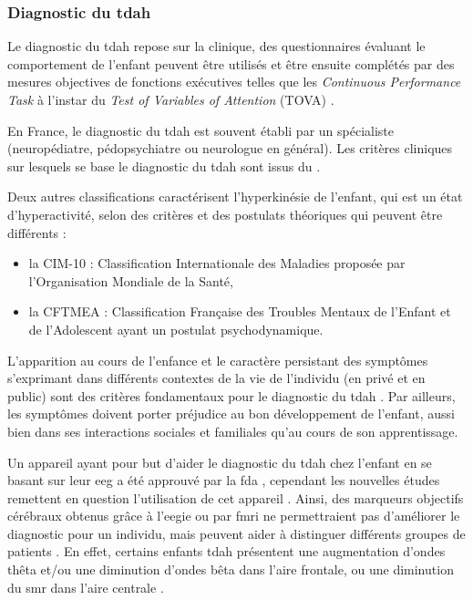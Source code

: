 \subsubsection{Diagnostic du \gls{tdah}}

Le diagnostic du \gls{tdah} repose sur la clinique, des questionnaires évaluant le comportement de l'enfant peuvent être utilisés et être ensuite 
complétés par des mesures objectives de fonctions exécutives telles que les \textit{Continuous Performance Task} \citep{Barkley1991} à l'instar du 
\textit{Test of Variables of Attention} (TOVA) \citep{Forbes1998}.

En France, le diagnostic du \gls{tdah} est souvent établi par un spécialiste (neuropédiatre, pédopsychiatre ou neurologue en général).
Les critères cliniques sur lesquels se base le diagnostic du \gls{tdah} sont issus du \citet{DSM-5}.

Deux autres classifications caractérisent l'hyperkinésie de l'enfant, qui est un état d'hyperactivité, selon des critères et des postulats théoriques 
qui peuvent être différents : 
\begin{itemize}
\item la CIM-10 : Classification Internationale des Maladies proposée par l'Organisation Mondiale de la Santé,
\item la CFTMEA : Classification Française des Troubles Mentaux de l'Enfant et de l'Adolescent ayant un postulat psychodynamique.
\end{itemize}

L'apparition au cours de l'enfance et le caractère persistant des symptômes s'exprimant dans différents contextes de la vie de l'individu (en privé et 
en public) sont des critères fondamentaux pour le diagnostic du \gls{tdah} \citep{HAS}. Par ailleurs, les symptômes doivent porter préjudice au bon 
développement de l'enfant, aussi bien dans ses interactions sociales et familiales qu'au cours de son apprentissage. 

Un appareil ayant pour but d'aider le diagnostic du \gls{tdah} chez l'enfant en se basant sur leur \gls{eeg} 
a été approuvé par la \gls{fda} \citep{FDA, NebaHealth}, cependant les nouvelles études remettent en question l'utilisation de cet appareil \citep{Arns2013, 
Zhang2017}. Ainsi, des marqueurs objectifs cérébraux obtenus grâce à l'\gls{eegie} ou par \gls{fmri} ne permettraient pas d'améliorer le diagnostic pour un individu, mais
peuvent aider à distinguer différents groupes de patients \citep{Johnstone2005, Zhang2017, Clarke2011}. En effet, certains enfants \gls{tdah} 
présentent une augmentation d'ondes thêta et/ou une diminution d'ondes bêta dans l'aire frontale, ou une diminution du \gls{smr} dans l'aire centrale
\citep{Monastra2005, Janzen1995, Loo2018}. 

